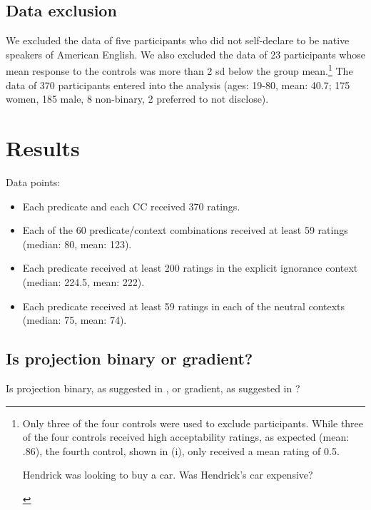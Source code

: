\documentclass[11pt,fleqn]{article}
\newcommand{\6}{\mbox{$[\hspace*{-.6mm}[$}}
\newcommand{\9}{\mbox{$]\hspace*{-.6mm}]$}}
\begin{document}
\subsection{Data exclusion} 

We excluded the data of five participants who did not self-declare to be native speakers of American English. We also excluded the data of 23 participants whose mean response to the controls was more than 2 sd below the group mean.\footnote{Only three of the four controls were used to exclude participants. While three of the four controls received high acceptability ratings, as expected (mean: .86), the fourth control, shown in (i), only received a mean rating of 0.5. 
\begin{exe}
 Hendrick was looking to buy a car. Was Hendrick's car expensive?
\end{exe}
} The data of 370 participants entered into the analysis (ages: 19-80, mean: 40.7; 175 women, 185 male, 8 non-binary, 2 preferred to not disclose). 

\section{Results}

Data points:

\begin{itemize}

\item Each predicate and each CC received 370 ratings. 

\item Each of the 60 predicate/context combinations received at least 59 ratings (median: 80, mean: 123).

\item Each predicate received at least 200 ratings in the explicit ignorance context (median: 224.5, mean: 222).

\item Each predicate received at least 59 ratings in each of the neutral contexts (median: 75, mean: 74).

\end{itemize}
 
\subsection{Is projection binary or gradient?}

Is projection binary, as suggested in \citealt{mandelkern-etal2020}, or gradient, as suggested in \citealt{degen-tonhauser-openmind,degen-tonhauser-language}?
\end{document}
